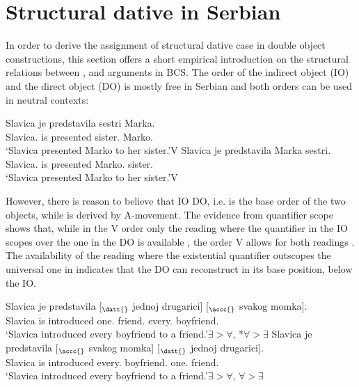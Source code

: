 \documentclass[output=paper,
modfonts,
newtxmath,
hidelinks
]{langscibook}
\begin{document}
\section{Structural dative in Serbian}

In order to derive the assignment of structural dative case in double object constructions, this section offers a short empirical introduction on the structural relations between \nomm, \accc{} and \datt{} arguments in BCS. The order of the indirect object (IO) and the direct object (DO) is mostly free in Serbian and both orders can be used in neutral contexts:

\ea\label{doubleobject1}
\ea\label{doubleobject1a} \gll Slavica je predstavila sestri Marka.\\
Slavica.\nomm{} is presented sister.\datt{} Marko.\accc\\
\glt `Slavica presented Marko to her sister.'\hfill V \before{} \datt{} \before{} \accc{}
\ex \label{doubleobject1b}\gll Slavica je predstavila Marka sestri.\\
Slavica.\nomm{} is presented Marko.\accc{} sister.\datt{}\\
\glt `Slavica presented Marko to her sister.'\hfill V \before{} \accc{} \before{} \datt{}
\z \z

\noindent However, there is reason to believe that IO \before{} DO, i.e.  is the base order of the two objects, while  is derived by A-movement. The evidence from quantifier scope \citep{aoun89,frey1989,bruening2001} shows that,  while in the V \before{} \datt{} \before{} \accc{} order only the reading where the quantifier in the IO scopes over the one in the DO is available , the order V \before{} \accc{} \before{} \datt{} allows for both readings . The availability of the reading where the existential quantifier outscopes the universal one in  indicates that the DO can reconstruct in its base position, below the IO. 

\ea\label{ex8} 
\ea\label{ex8a}\gll Slavica je predstavila [$_{\datt{}}$ jednoj drugarici] [$_{\accc{}}$ svakog momka].\\
Slavica is introduced {} one.\datt{} friend.\datt{} {} every.\accc{} boyfriend.\accc\\
\glt `Slavica introduced every boyfriend to a friend.'\hfill  $\exists>\forall$, *$\forall>\exists$ 
\ex\label{quantifierscope}\gll Slavica je predstavila [$_{\accc{}}$ svakog momka] [$_{\datt{}}$ jednoj drugarici].\\
Slavica is introduced {} every.\accc{} boyfriend.\accc{} {} one.\datt{} friend.\datt\\
\glt `Slavica introduced every boyfriend to a friend.'\hfill $\exists>\forall$, $\forall>\exists$ 
\z \z
\end{document}
